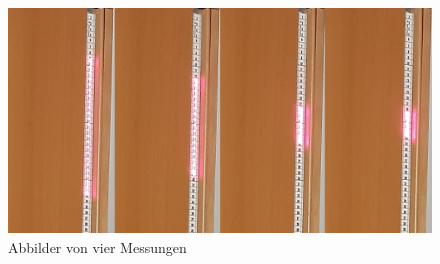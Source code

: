\begin{figure}[h!]	\centering	\includegraphics[width=\bildwidth]{pics/ImageMeasure01.jpg}	\caption{Abbilder von vier Messungen}	\label{ImageMeasure01}	\end{figure}


